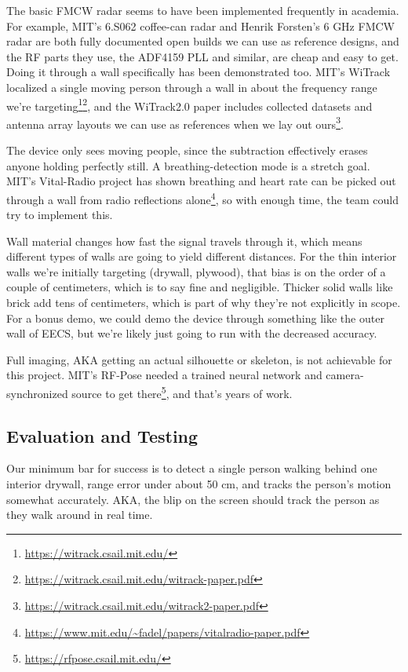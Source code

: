 \documentclass[11pt]{article}
\begin{document}
The basic FMCW radar seems to have been implemented frequently in academia. For example, MIT's 6.S062 coffee-can radar and Henrik Forsten's 6 GHz FMCW radar are both fully documented open builds we can use as reference designs, and the RF parts they use, the ADF4159 PLL and similar, are cheap and easy to get. Doing it through a wall specifically has been demonstrated too. MIT's WiTrack localized a single moving person through a wall in about the frequency range we're targeting\footnote{\url{https://witrack.csail.mit.edu/}}\footnote{\url{https://witrack.csail.mit.edu/witrack-paper.pdf}}, and the WiTrack2.0 paper includes collected datasets and antenna array layouts we can use as references when we lay out ours\footnote{\url{https://witrack.csail.mit.edu/witrack2-paper.pdf}}. 

The device only sees moving people, since the subtraction effectively erases anyone holding perfectly still. A breathing-detection mode is a stretch goal. MIT's Vital-Radio project has shown breathing and heart rate can be picked out through a wall from radio reflections alone\footnote{\url{https://www.mit.edu/~fadel/papers/vitalradio-paper.pdf}}, so with enough time, the team could try to implement this.

Wall material changes how fast the signal travels through it, which means different types of walls are going to yield different distances. For the thin interior walls we're initially targeting (drywall, plywood), that bias is on the order of a couple of centimeters, which is to say fine and negligible. Thicker solid walls like brick add tens of centimeters, which is part of why they're not explicitly in scope. For a bonus demo, we could demo the device through something like the outer wall of EECS, but we're likely just going to run with the decreased accuracy. 

Full imaging, AKA getting an actual silhouette or skeleton, is not achievable for this project. MIT's RF-Pose needed a trained neural network and camera-synchronized source to get there\footnote{\url{https://rfpose.csail.mit.edu/}}, and that's years of work. 

\subsection*{Evaluation and Testing}

Our minimum bar for success is to detect a single person walking behind one interior drywall, range error under about 50 cm, and tracks the person's motion somewhat accurately. AKA, the blip on the screen should track the person as they walk around in real time.
\end{document}
